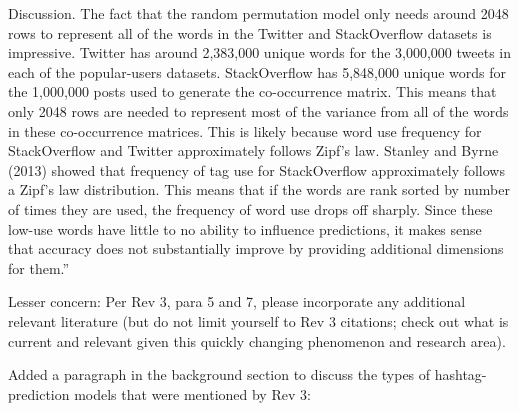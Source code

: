 \documentclass[answers,12pt]{exam}
\begin{document}
\begin{questions}
\begin{solution}
Discussion. The fact that the random permutation model only needs around 2048 rows to represent all of the words in the Twitter and StackOverflow datasets is impressive. Twitter has around 2,383,000 unique words for the 3,000,000 tweets in each of the popular-users datasets. StackOverflow has 5,848,000 unique words for the 1,000,000 posts used to generate the co-occurrence matrix. This means that only 2048 rows are needed to represent most of the variance from all of the words in these co-occurrence matrices. This is likely because word use frequency for StackOverflow and Twitter approximately follows Zipf’s law. Stanley and Byrne (2013) showed that frequency of tag use for StackOverflow approximately follows a Zipf’s law distribution. This means that if the words are rank sorted by number of times they are used, the frequency of word use drops off sharply. Since these low-use words have little to no ability to influence predictions, it makes sense that accuracy does not substantially improve by providing additional dimensions for them.''

\end{solution}

\question Lesser concern: Per Rev 3, para 5 and 7, please incorporate any additional relevant literature (but do not limit yourself to Rev 3 citations; check out what is current and relevant given this quickly changing phenomenon and research area).

\begin{solution}
Added a paragraph in the background section to discuss the types of hashtag-prediction models that were mentioned by Rev 3:


\end{solution}
\end{questions}
\end{document}
